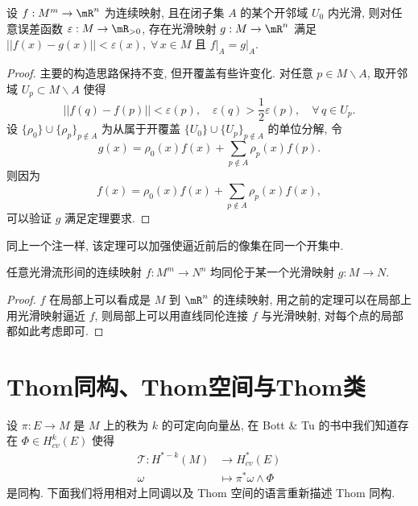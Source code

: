         \begin{theorem}[用光滑映射逼近连续映射且保持在某个闭集不动]
            设 $f:M^m\rightarrow\mR^n$ 为连续映射, 
            且在闭子集 $A$ 的某个开邻域 $U_0$ 内光滑, 
            则对任意误差函数 $\varepsilon:M\rightarrow\mR_{>0}$,
            存在光滑映射 $g:M\rightarrow\mR^n$ 满足 
            $||f(x)-g(x)||<\varepsilon(x),\;\forall\,x\in M$ 且 
            $f\big|_A = g\big|_A$.
        \end{theorem}
        \begin{proof}
            主要的构造思路保持不变, 但开覆盖有些许变化. 
            对任意 $p\in M\backslash A$, 
            取开邻域 $U_p\subset M\backslash A$ 使得 
            \begin{equation*}
                ||f(q)-f(p)||<\varepsilon(p),\quad\varepsilon(q)
                >\frac{1}{2}\varepsilon(p),\quad\forall\,q\in U_p.
            \end{equation*}
            设 $\{\rho_0\}\cup\{\rho_p\}_{p\notin A}$ 
            为从属于开覆盖 $\{U_0\}\cup\{U_p\}_{p\notin A}$ 的单位分解, 令
            \begin{equation*}
                g(x) = \rho_0(x)f(x) + \sum_{p\notin A}\rho_p(x)f(p).
            \end{equation*}
            则因为
            \begin{equation*}
                f(x) = \rho_0(x)f(x) + \sum_{p\notin A}\rho_p(x)f(x), 
            \end{equation*}
            可以验证 $g$ 满足定理要求.
        \end{proof}
        \begin{remark}
            同上一个注一样, 该定理可以加强使逼近前后的像集在同一个开集中.
        \end{remark}
        \begin{theorem}[任意连续映射都同伦于一个光滑映射]
            任意光滑流形间的连续映射 $f:M^m\rightarrow N^n$ 
            均同伦于某一个光滑映射 $g:M\rightarrow N$.
        \end{theorem}
        \begin{proof}
            $f$ 在局部上可以看成是 $M$ 到 $\mR^n$ 的连续映射, 
            用之前的定理可以在局部上用光滑映射逼近 $f$, 
            则局部上可以用直线同伦连接 $f$ 与光滑映射, 
            对每个点的局部都如此考虑即可.

            
        \end{proof}

    \section{Thom同构、Thom空间与Thom类}
        设 $\pi:E\rightarrow M$ 是 $M$ 上的秩为 $k$ 的可定向向量丛, 
        在 {\rm Bott \& Tu } 的书中我们知道存在 $\Phi\in H^k_{cv}(E)$ 使得 
        \begin{align*}
            \mathcal{T}:H^{*-k}(M)&\rightarrow H^*_{cv}(E) \\
            \omega&\mapsto\pi^*\omega\wedge\Phi
        \end{align*}
        是同构. 下面我们将用相对上同调以及 Thom 空间的语言重新描述 Thom 同构. 

